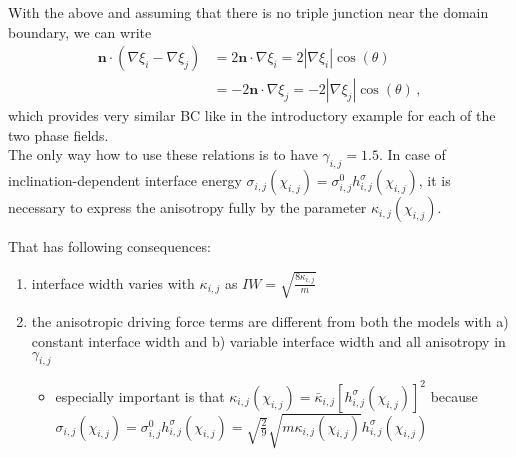 With the above and assuming that there is no triple junction near the domain boundary, we can write
\begin{equation}
	\begin{split}
		\bm{n}\cdot(\nabla\xi_i-\nabla\xi_j) &= 2\bm{n}\cdot\nabla\xi_i = 2|\nabla\xi_i|\cos(\theta) \\ &= -2\bm{n}\cdot\nabla\xi_j = -2|\nabla\xi_j|\cos(\theta) \,,
	\end{split}
\end{equation}
which provides very similar BC like in the introductory example for each of the two phase fields.\\
The only way how to use these relations is to have $\gamma_{i,j}=1.5$. In case of inclination-dependent interface energy $\sigma_{i,j}(\chi_{i,j})=\sigma_{i,j}^0h_{i,j}^\sigma(\chi_{i,j})$, it is necessary to express the anisotropy fully by the parameter $\kappa_{i,j}(\chi_{i,j})$. 


That has following consequences:
\begin{enumerate}
	\item interface width varies with $\kappa_{i,j}$ as $IW = \sqrt{\frac{8\kappa_{i,j}}{m}}$
	\item the anisotropic driving force terms are different from both the models with a) constant interface width and b) variable interface width and all anisotropy in $\gamma_{i,j}$
	\begin{itemize}
		\item especially important is that $\kappa_{i,j}(\chi_{i,j})=\bar{\kappa}_{i,j}[h_{i,j}^\sigma(\chi_{i,j})]^2$ because $\sigma_{i,j}(\chi_{i,j})=\sigma_{i,j}^0h_{i,j}^\sigma(\chi_{i,j}) = \sqrt{\frac{2}{9}}\sqrt{m\kappa_{i,j}(\chi_{i,j})}h_{i,j}^\sigma(\chi_{i,j})$
	\end{itemize}
\end{enumerate}

\cleardoublepage

